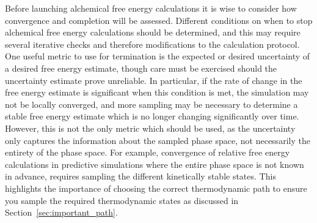 \documentclass[9pt,bestpractices]{livecoms}
\begin{document}


% 

Before launching alchemical free energy calculations it is wise to consider how convergence and completion will be assessed. Different conditions on when to stop alchemical free energy calculations should be determined, and this may require several iterative checks and therefore modifications to the calculation protocol.
One useful metric to use for termination is the expected or desired uncertainty of a desired free energy estimate, though care must be exercised should the uncertainty estimate prove unreliable.
In particular, if the rate of change in the free energy estimate is significant when this condition is met, the simulation may not be locally converged, and more sampling may be necessary to determine a stable free energy estimate which is no longer changing significantly over time. 
However, this is not the only metric which should be used, as the uncertainty only captures the information about the sampled phase space, not necessarily the entirety of the phase space.  
For example, 
convergence of relative free energy calculations in predictive simulations where the entire phase space is not known in advance, requires sampling the different kinetically stable states.  
This highlights the importance of choosing the correct thermodynamic path to ensure you sample the required thermodynamic states as discussed in Section~\ref{sec:important_path}.
\end{document}
